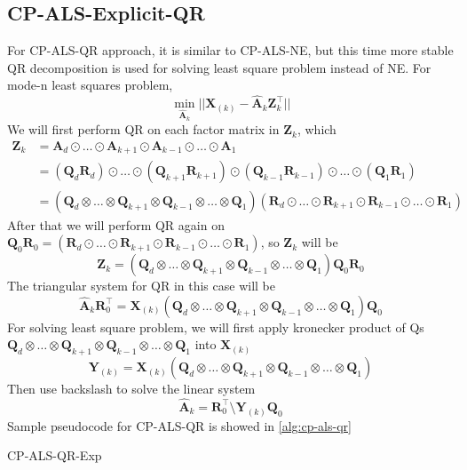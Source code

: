 \documentclass{article}
\newcommand{\mat}[1]{\mathbf{#1}}
\begin{document}
\subsection{CP-ALS-Explicit-QR}
For CP-ALS-QR approach, it is similar to CP-ALS-NE, but this time more stable QR decomposition is used for solving least square problem instead of NE.
For mode-n least squares problem,
$$\min_{\mat{\hat{A}}_k}||\mat{X}_{(k)} - {\mat{\hat{A}}_k}\mat{Z}^\top_k ||$$
We will first perform QR on each factor matrix in $\mat{Z}_k$, which 
\begin{align}
  \mat{Z}_k &= \mat{A}_d \odot \dots \odot \mat{A}_{k+1} \odot \mat{A}_{k-1} \odot \dots \odot \mat{A}_1 \nonumber \\
  &= (\mat{Q}_d\mat{R}_d) \odot \dots \odot (\mat{Q}_{k+1}\mat{R}_{k+1}) \odot (\mat{Q}_{k-1}\mat{R}_{k-1}) \odot \dots \odot (\mat{Q}_1\mat{R}_1) \nonumber \\
  &= (\mat{Q}_d \otimes \dots \otimes \mat{Q}_{k+1} \otimes \mat{Q}_{k-1} \otimes \dots \otimes \mat{Q}_1)(\mat{R}_d \odot \dots \odot \mat{R}_{k+1} \odot \mat{R}_{k-1} \odot \dots \odot \mat{R}_1)\nonumber  
\end{align}
After that we will perform QR again on $\mat{Q}_0\mat{R}_0= (\mat{R}_d \odot \dots \odot \mat{R}_{k+1} \odot \mat{R}_{k-1} \odot \dots \odot \mat{R}_1)$, so $\mat{Z}_k$ will be
$$\mat{Z}_k = (\mat{Q}_d \otimes \dots \otimes \mat{Q}_{k+1} \otimes \mat{Q}_{k-1} \otimes \dots \otimes \mat{Q}_1)\mat{Q}_0\mat{R}_0$$
The triangular system for QR in this case will be 
\begin{equation}
  \hat{\mat{A}}_k\mat{R}_0^\top = \mat{X}_{(k)}(\mat{Q}_d \otimes \dots \otimes \mat{Q}_{k+1} \otimes \mat{Q}_{k-1} \otimes \dots \otimes \mat{Q}_1)\mat{Q}_0 
  \label{eq:CP-EXP-QR}
\end{equation}
For solving least square problem, we will first apply kronecker product of Qs $\mat{Q}_d \otimes \dots \otimes \mat{Q}_{k+1} \otimes \mat{Q}_{k-1} \otimes \dots \otimes \mat{Q}_1$ into $\mat{X}_{(k)}$
$$\mat{Y}_{(k)} = \mat{X}_{(k)}(\mat{Q}_d \otimes \dots \otimes \mat{Q}_{k+1} \otimes \mat{Q}_{k-1} \otimes \dots \otimes \mat{Q}_1)$$
Then use backslash to solve the linear system
\begin{equation}
  \hat{\mat{A}}_k = \mat{R}_0^\top \text{\textbackslash} \mat{Y}_{(k)}\mat{Q}_0
\end{equation}
Sample pseudocode for CP-ALS-QR is showed in \cref{alg:cp-als-qr}
\begin{algorithm}
  \caption{CP-ALS-QR-Exp}
  \label{alg:cp-als-qr}
  
\end{algorithm}
\end{document}
